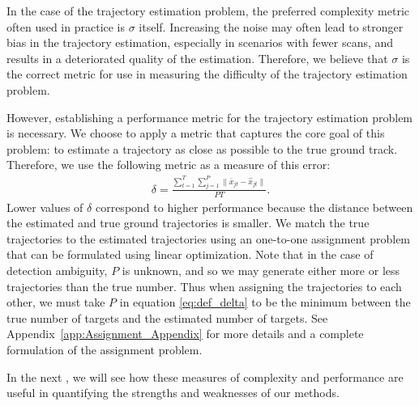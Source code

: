 In the case of the trajectory estimation problem, the preferred complexity metric often used in practice is $\sigma$ itself. Increasing the noise may often lead to stronger bias in the trajectory estimation, especially in scenarios with fewer scans, and results in a deteriorated quality of the estimation. Therefore, we believe that $\sigma$ is the correct metric for use in measuring the difficulty of the trajectory estimation problem. 

However, establishing a performance metric for the trajectory estimation problem is necessary. We choose to apply a metric that captures the core goal of this problem: to estimate a trajectory as close as possible to the true ground track. Therefore, we use the following metric as a measure of this error: 
\begin{align}\label{eq:def_delta}
	\delta = \frac{\sum\limits_{t=1}^{T}\sum\limits_{j=1}^{P}\| \bar{x}_{jt} - \hat{x}_{jt} \|}{PT}.
\end{align}
Lower values of $\delta$ correspond to higher performance because the distance between the estimated and true ground trajectories is smaller. We match the true trajectories to the estimated trajectories using an one-to-one assignment problem that can be formulated using linear optimization. Note that in the case of detection ambiguity, $P$ is unknown, and so we may generate either more or less trajectories than the true number. Thus when assigning the trajectories to each other, we must take $P$ in equation \eqref{eq:def_delta} to be the minimum between the true number of targets and the estimated number of targets. See Appendix~\ref{app:Assignment_Appendix} for more details and a complete formulation of the assignment problem. 

In the next \mytitle, we will see how these measures of complexity and performance are useful in quantifying the strengths and weaknesses of our methods.
